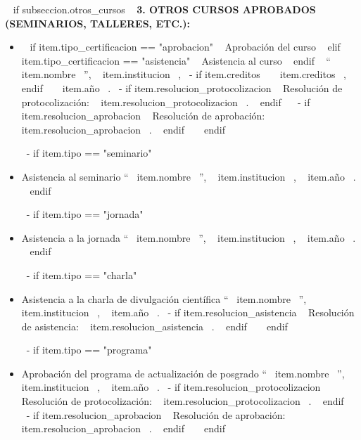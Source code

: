     ~{ if subseccion.otros_cursos }~
      \textbf{3. OTROS CURSOS APROBADOS (SEMINARIOS, TALLERES, ETC.):}
      \begin{itemize}
      ~{ for item in subseccion.otros_cursos }~
        ~{- if item.tipo == "curso" }~
          \item ~{ if item.tipo_certificacion == "aprobacion" }~ Aprobación del curso ~{ elif item.tipo_certificacion == "asistencia" }~ Asistencia al curso ~{ endif }~
                ``~{{ item.nombre }}~'', ~{{ item.institucion }}~,
                ~{- if item.creditos }~ ~{{ item.creditos }}~, ~{ endif }~
                ~{{ item.año }}~.
                ~{- if item.resolucion_protocolizacion }~ Resolución de protocolización: ~{{ item.resolucion_protocolizacion }}~. ~{ endif }~
                ~{- if item.resolucion_aprobacion }~ Resolución de aprobación: ~{{ item.resolucion_aprobacion }}~. ~{ endif }~
          \espacioEntreItems{}
        ~{ endif }~

        ~{- if item.tipo == "seminario" }~
          \item Asistencia al seminario ``~{{ item.nombre }}~'', ~{{ item.institucion }}~, ~{{ item.año }}~.
          \espacioEntreItems{}
        ~{ endif }~

        ~{- if item.tipo == "jornada" }~
          \item Asistencia a la jornada ``~{{ item.nombre }}~'', ~{{ item.institucion }}~, ~{{ item.año }}~.
          \espacioEntreItems{}
        ~{ endif }~

        ~{- if item.tipo == "charla" }~
          \item Asistencia a la charla de divulgación científica ``~{{ item.nombre }}~'', ~{{ item.institucion }}~, ~{{ item.año }}~.
                ~{- if item.resolucion_asistencia }~ Resolución de asistencia: ~{{ item.resolucion_asistencia }}~. ~{ endif }~
          \espacioEntreItems{}
        ~{ endif }~

        ~{- if item.tipo == "programa" }~
          \item Aprobación del programa de actualización de posgrado ``~{{ item.nombre }}~'', ~{{ item.institucion }}~, ~{{ item.año }}~.
                ~{- if item.resolucion_protocolizacion }~ Resolución de protocolización: ~{{ item.resolucion_protocolizacion }}~. ~{ endif }~
                ~{- if item.resolucion_aprobacion }~ Resolución de aprobación: ~{{ item.resolucion_aprobacion }}~. ~{ endif }~
          \espacioEntreItems{}
        ~{ endif }~


\end{itemize}
